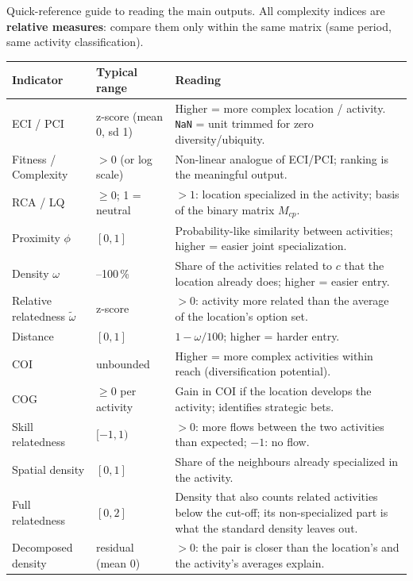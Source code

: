 \documentclass[12pt, a4paper]{article}
\begin{document}
Quick-reference guide to reading the main outputs. All complexity
indices are \textbf{relative measures}: compare them only within the
same matrix (same period, same activity classification).

{\renewcommand{\arraystretch}{1.35}\small
\begin{longtable}{>{\raggedright\arraybackslash}p{3.4cm}>{\raggedright\arraybackslash}p{3.0cm}>{\raggedright\arraybackslash}p{8.6cm}}
\toprule
\textbf{Indicator} & \textbf{Typical range} & \textbf{Reading} \\
\midrule\endhead
ECI / PCI & z-score (mean 0, sd 1) & Higher = more complex location /
  activity. \texttt{NaN} = unit trimmed for zero diversity/ubiquity. \\
Fitness / Complexity & $> 0$ (or log scale) & Non-linear analogue of
  ECI/PCI; ranking is the meaningful output. \\
RCA / LQ & $\geq 0$; 1 = neutral & $>1$: location specialized in the
  activity; basis of the binary matrix $M_{cp}$. \\
Proximity $\phi$ & $[0, 1]$ & Probability-like similarity between
  activities; higher = easier joint specialization. \\
Density $\omega$ & 0--100\,\% & Share of the activities related to $c$
  that the location already does; higher = easier entry. \\
Relative relatedness $\tilde\omega$ & z-score & $>0$: activity more
  related than the average of the location's option set. \\
Distance & $[0, 1]$ & $1-\omega/100$; higher = harder entry. \\
COI & unbounded & Higher = more complex activities within reach
  (diversification potential). \\
COG & $\geq 0$ per activity & Gain in COI if the location develops the
  activity; identifies strategic bets. \\
Skill relatedness & $[-1, 1)$ & $>0$: more flows between the two
  activities than expected; $-1$: no flow. \\
Spatial density & $[0, 1]$ & Share of the neighbours already specialized
  in the activity. \\
Full relatedness & $[0, 2]$ & Density that also counts related
  activities below the cut-off; its non-specialized part is what the
  standard density leaves out. \\
Decomposed density & residual (mean 0) & $>0$: the pair is closer than
  the location's and the activity's averages explain. \\

\end{longtable}}
\end{document}
